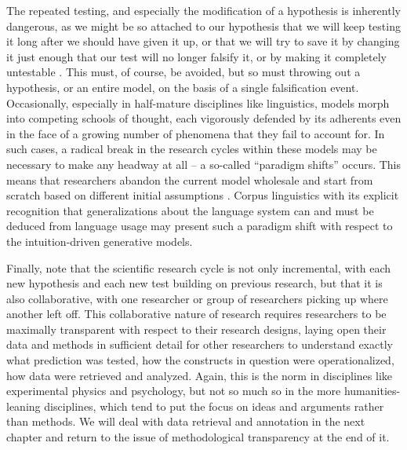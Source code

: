 The repeated testing, and especially the modification of a hypothesis is inherently dangerous, as we might be so attached to our hypothesis that we will keep testing it long after we should have given it up, or that we will try to save it by changing it just enough that our test will no longer falsify it, or by making it completely untestable \citep[cf.][37]{popper_conjectures_1963}. This must, of course, be avoided, but so must throwing out a hypothesis, or an entire model, on the basis of a single falsification event. Occasionally, especially in half-mature disciplines like linguistics, models morph into competing schools of thought, each vigorously defended by its adherents even in the face of a growing number of phenomena that they fail to account for. In such cases, a radical break in the research cycles within these models may be necessary to make any headway at all -- a so-called ``paradigm shifts'' occurs. This means that researchers abandon the current model wholesale and start from scratch based on different initial assumptions \citep[see][]{kuhn_structure_1962}. Corpus linguistics with its explicit recognition that generalizations about the language system can and must be deduced from language usage may present such a paradigm shift with respect to the intuition-driven generative models.

Finally, note that the scientific research cycle is not only incremental, with each new hypothesis and each new test building on previous research, but that it is also collaborative, with one researcher or group of researchers picking up where another left off. This collaborative nature of research requires researchers to be maximally transparent with respect to their research designs, laying open their data and methods in sufficient detail for other researchers to understand exactly what prediction was tested, how the constructs in question were operationalized, how data were retrieved and analyzed. Again, this is the norm in disciplines like experimental physics and psychology, but not so much so in the more humanities-leaning disciplines, which tend to put the focus on ideas and arguments rather than methods. We will deal with data retrieval and annotation in the next chapter and return to the issue of methodological transparency at the end of it.
